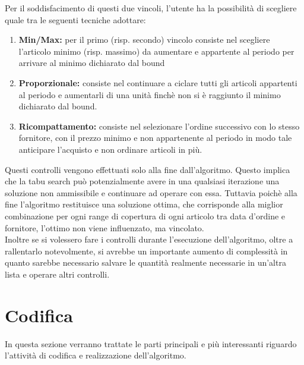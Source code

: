 Per il soddisfacimento di questi due vincoli, l'utente ha la
possibilità di scegliere quale tra le seguenti tecniche adottare:
\begin{enumerate}
    \item \textbf{Min/Max:} per il primo (risp. secondo) vincolo
    consiste nel scegliere l'articolo minimo (risp. massimo)
    da aumentare e appartente al periodo per arrivare al
    minimo dichiarato dal bound
    \item \textbf{Proporzionale:} consiste nel continuare a ciclare
    tutti gli articoli appartenti al periodo e aumentarli di
    una unità finchè non si è raggiunto il minimo
    dichiarato dal bound.
    \item \textbf{Ricompattamento:} consiste nel selezionare l'ordine
    successivo con lo stesso fornitore, con il prezzo minimo e
    non appartenente al periodo in modo tale anticipare l'acquisto
    e non ordinare articoli in più.
\end{enumerate}
\vspace*{0.5cm}
\noindent Questi controlli vengono effettuati solo alla fine dall'algoritmo.
Questo implica che la tabu search può potenzialmente avere in
una qualsiasi iterazione una soluzione non ammissibile e
continuare ad operare con essa. Tuttavia poichè alla fine
l'algoritmo restituisce una soluzione ottima, che corrisponde
alla miglior combinazione per ogni range di copertura di
ogni articolo tra data d'ordine e fornitore, l'ottimo non viene
influenzato, ma vincolato.\\
Inoltre se si volessero fare i controlli durante l'esecuzione dell'algoritmo,
oltre a rallentarlo notevolmente, si avrebbe un importante aumento di
complessità in quanto sarebbe necessario salvare le quantità realmente
necessarie in un'altra lista e operare altri controlli.

\newpage

\section{Codifica}
\label{sec:codifica}
\noindent In questa sezione verranno trattate le parti principali e più interessanti riguardo l'attività
di codifica e realizzazione dell'algoritmo.

